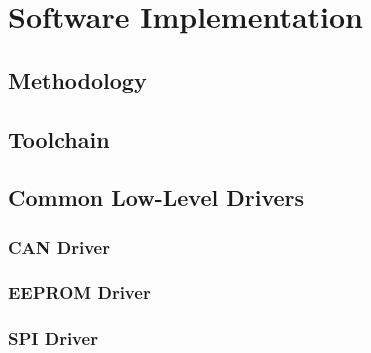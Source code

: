 \section{Software Implementation\label{sec:Software-Implementation}}


\subsection{Methodology}


\subsection{Toolchain}


\subsection{Common Low-Level Drivers}


\subsubsection{CAN Driver}


\subsubsection{EEPROM Driver}


\subsubsection{SPI Driver}











